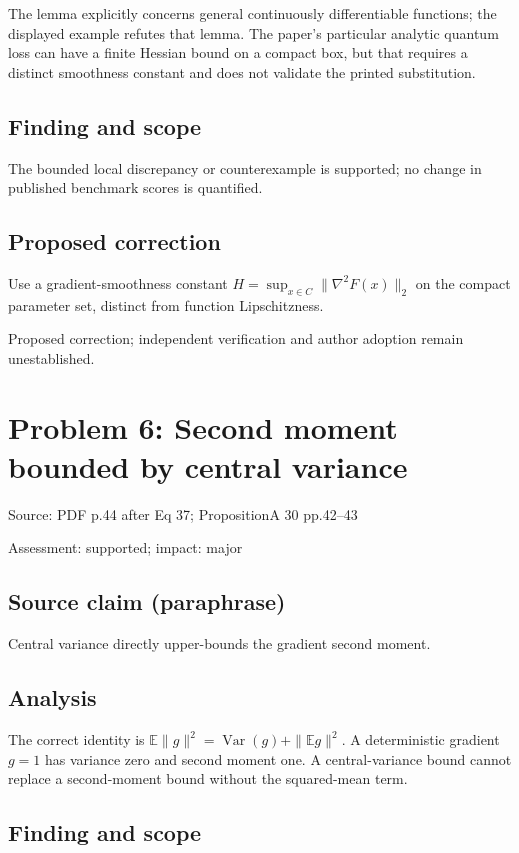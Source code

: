 \documentclass[11pt]{article}
\begin{document}
The lemma explicitly concerns general continuously differentiable functions; the displayed example refutes that lemma. The paper’s particular analytic quantum loss can have a finite Hessian bound on a compact box, but that requires a distinct smoothness constant and does not validate the printed substitution.

\subsection*{Finding and scope}

The bounded local discrepancy or counterexample is supported; no change in published benchmark scores is quantified.

\subsection*{Proposed correction}

Use a gradient-smoothness constant \(H=\sup_{x\in C}\|\nabla^2F(x)\|_2\) on the compact parameter set, distinct from function Lipschitzness.

Proposed correction; independent verification and author adoption remain unestablished.

\section*{Problem 6: Second moment bounded by central variance}

Source: PDF p.44 after Eq 37; PropositionA 30 pp.42–43

Assessment: supported; impact: major

\subsection*{Source claim (paraphrase)}

Central variance directly upper-bounds the gradient second moment.

\subsection*{Analysis}

The correct identity is \(\mathbb E\|g\|^2=\operatorname{Var}(g)+\|\mathbb Eg\|^2\). A deterministic gradient \(g=1\) has variance zero and second moment one. A central-variance bound cannot replace a second-moment bound without the squared-mean term.

\subsection*{Finding and scope}
\end{document}

